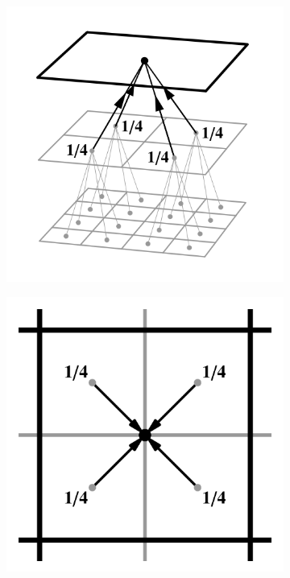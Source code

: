 \begin{figure}[htb]
  \centering
  \begin{subfigure}[b]{0.25\textwidth}
    \centering\includegraphics[width=\textwidth]{graphics/pull_weights_marroquim1}
    \caption{}
  \end{subfigure}%
  \begin{subfigure}[b]{0.25\textwidth}
    \centering\includegraphics[width=\textwidth]{graphics/pull_weights_marroquim2}

\end{subfigure}
\end{figure}
